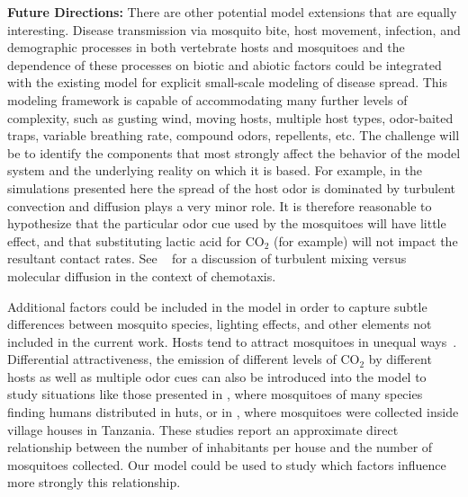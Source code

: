 \documentclass[10pt]{article}
\begin{document}
\textbf{Future Directions:} There are other potential model extensions that are equally interesting. 
Disease transmission via mosquito bite, host movement, infection, and demographic processes in both vertebrate hosts and mosquitoes and the dependence of these processes on biotic and abiotic factors could be integrated with the existing model for explicit small-scale modeling of disease spread. This modeling framework is capable of accommodating many further levels of complexity, such as gusting wind, moving hosts, multiple host types, odor-baited traps, variable breathing rate, compound odors, repellents, etc. The challenge will be to identify the components that most strongly affect the behavior of the model system and the underlying reality on which it is based. For example, in the simulations presented here the spread of the host odor is dominated by turbulent convection and diffusion plays a very minor role. It is therefore reasonable to hypothesize that the particular odor cue used by the mosquitoes will have little effect, and that substituting lactic acid for CO$_2$ (for example) will not impact the resultant contact rates. See ~\cite{Vickers2000} for a discussion of turbulent mixing versus molecular diffusion in the context of chemotaxis.

Additional factors could be included in the model in order to capture subtle differences between mosquito species, lighting effects, and other elements not included in the current work.  Hosts tend to attract mosquitoes in unequal ways~\cite{Knols1995}. Differential attractiveness, the emission of different levels of CO$_2$ by different hosts as well as multiple odor cues can also be introduced into the model to study situations like those presented in \cite{Haddow1942}, where mosquitoes of many species finding humans distributed in huts, or in \cite{KileenEtAl2007A}, where mosquitoes were collected inside village houses in Tanzania. These studies report an approximate direct relationship between the number of inhabitants per house and the number of mosquitoes collected. Our model could be used to study which factors influence more strongly this relationship.
\end{document}
